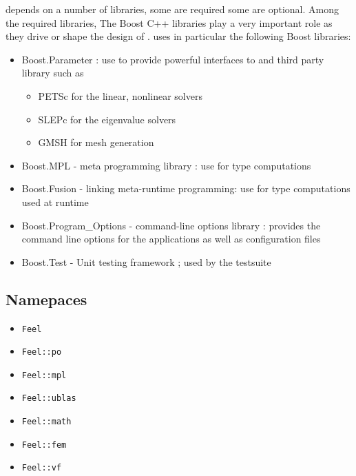 \feel depends on a number of libraries, some are required some are optional.
Among the required libraries, The Boost C++ libraries play a very important role
as they drive or shape the  design of \feel. \feel uses in particular the
following Boost libraries:
\begin{itemize}
\item Boost.Parameter : use to provide powerful
  interfaces to \feel and third party library such as 
  \begin{itemize}
  \item PETSc  for the linear, nonlinear solvers
  \item SLEPc for the eigenvalue solvers
  \item GMSH for mesh generation
  \end{itemize}
\item Boost.MPL - meta programming library : use for type computations
\item Boost.Fusion - linking meta-runtime programming: use for type computations
  used at runtime
\item Boost.Program\_Options - command-line options library : provides the
  command line options for the \feel applications as well as configuration files
\item Boost.Test - Unit testing framework ; used by the \feel testsuite
\end{itemize}

\subsection{\feel Namepaces}

\begin{itemize}
\item \lstinline!Feel!
\item \lstinline!Feel::po!
\item \lstinline!Feel::mpl!
\item \lstinline!Feel::ublas!
\item \lstinline!Feel::math!
\item \lstinline!Feel::fem!
\item \lstinline!Feel::vf!

\end{itemize}